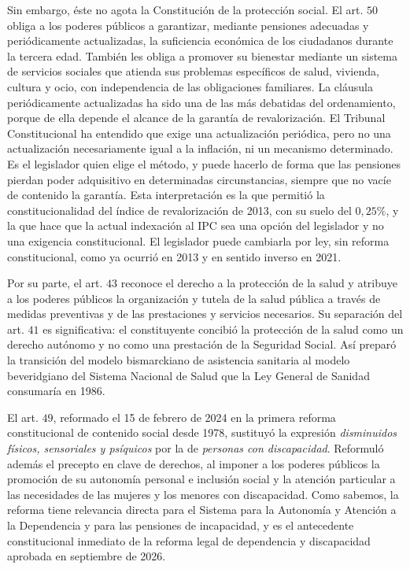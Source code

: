 \documentclass[10pt,a4paper]{article}
\begin{document}
Sin embargo, éste no agota la Constitución de la protección social. El art. $50$ obliga a los poderes públicos a garantizar, mediante pensiones adecuadas y periódicamente actualizadas, la suficiencia económica de los ciudadanos durante la tercera edad. También les obliga a promover su bienestar mediante un sistema de servicios sociales que atienda sus problemas específicos de salud, vivienda, cultura y ocio, con independencia de las obligaciones familiares. La cláusula periódicamente actualizadas ha sido una de las más debatidas del ordenamiento, porque de ella depende el alcance de la garantía de revalorización. El Tribunal Constitucional ha entendido que exige una actualización periódica, pero no una actualización necesariamente igual a la inflación, ni un mecanismo determinado. Es el legislador quien elige el método, y puede hacerlo de forma que las pensiones pierdan poder adquisitivo en determinadas circunstancias, siempre que no vacíe de contenido la garantía. Esta interpretación es la que permitió la constitucionalidad del índice de revalorización de 2013, con su suelo del $0,25\%$, y la que hace que la actual indexación al IPC sea una opción del legislador y no una exigencia constitucional. El legislador puede cambiarla por ley, sin reforma constitucional, como ya ocurrió en 2013 y en sentido inverso en 2021.

Por su parte, el art. $43$ reconoce el derecho a la protección de la salud y atribuye a los poderes públicos la organización y tutela de la salud pública a través de medidas preventivas y de las prestaciones y servicios necesarios. Su separación del art. $41$ es significativa: el constituyente concibió la protección de la salud como un derecho autónomo y no como una prestación de la Seguridad Social. Así preparó la transición del modelo bismarckiano de asistencia sanitaria al modelo beveridgiano del Sistema Nacional de Salud que la Ley General de Sanidad consumaría en 1986.

El art. $49$, reformado el 15 de febrero de 2024 en la primera reforma constitucional de contenido social desde 1978, sustituyó la expresión \textit{disminuidos físicos, sensoriales y psíquicos} por la de \textit{personas con discapacidad}. Reformuló además el precepto en clave de derechos, al imponer a los poderes públicos la promoción de su autonomía personal e inclusión social y la atención particular a las necesidades de las mujeres y los menores con discapacidad. Como sabemos, la reforma tiene relevancia directa para el Sistema para la Autonomía y Atención a la Dependencia y para las pensiones de incapacidad, y es el antecedente constitucional inmediato de la reforma legal de dependencia y discapacidad aprobada en septiembre de 2026.
\end{document}
